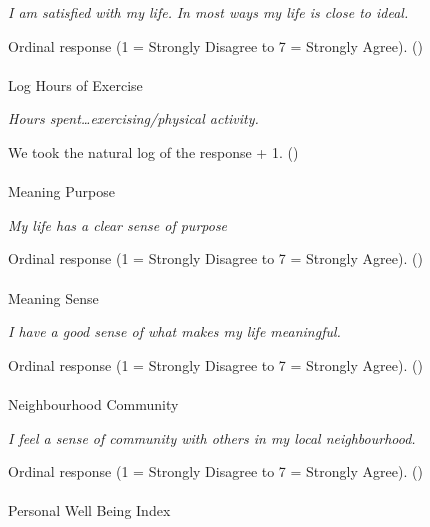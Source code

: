 \documentclass[
  single column]{article}
\makeatletter
\let\oldparagraph\paragraph
\renewcommand{\paragraph}{
    \@ifstar
      \xxxParagraphStar
      \xxxParagraphNoStar
  }
\newcommand{\xxxParagraphStar}[1]{\oldparagraph*{#1}\mbox{}}
\newcommand{\xxxParagraphNoStar}[1]{\oldparagraph{#1}\mbox{}}
\makeatother
\begin{document}
\emph{I am satisfied with my life.} \emph{In most ways my life is close
to ideal.}

Ordinal response (1 = Strongly Disagree to 7 = Strongly Agree).
()

\paragraph{Log Hours of Exercise}\label{log-hours-of-exercise-1}

\emph{Hours spent\ldots exercising/physical activity.}

We took the natural log of the response + 1.
()

\paragraph{Meaning Purpose}\label{meaning-purpose}

\emph{My life has a clear sense of purpose}

Ordinal response (1 = Strongly Disagree to 7 = Strongly Agree).
()

\paragraph{Meaning Sense}\label{meaning-sense}

\emph{I have a good sense of what makes my life meaningful.}

Ordinal response (1 = Strongly Disagree to 7 = Strongly Agree).
()

\paragraph{Neighbourhood Community}\label{neighbourhood-community}

\emph{I feel a sense of community with others in my local
neighbourhood.}

Ordinal response (1 = Strongly Disagree to 7 = Strongly Agree).
()

\paragraph{Personal Well Being Index}\label{personal-well-being-index}
\end{document}
